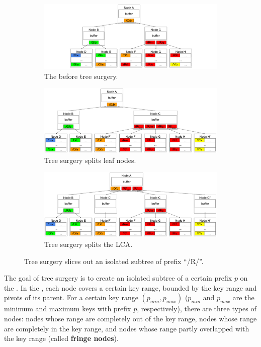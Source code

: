 \begin{figure}
    \begin{subfigure}{\textwidth}
        \centering
        \includegraphics[width=.9\linewidth]{fig/slice-1}
        \caption{\label{subfig:slice-1} The \bet before tree surgery.}
    \end{subfigure}
    \begin{subfigure}{\textwidth}
        \centering
        \includegraphics[width=.9\linewidth]{fig/slice-2}
        \caption{\label{subfig:slice-2} Tree surgery splits leaf nodes.}
    \end{subfigure}
    \begin{subfigure}{\textwidth}
        \centering
        \includegraphics[width=.9\linewidth]{fig/slice-3}
        \caption{\label{subfig:slice-3} Tree surgery splits the LCA.}
    \end{subfigure}
    \caption[Tree surgery example]{\label{fig:slice}
        Tree surgery slices out an isolated subtree of prefix ``/R/''.}
\end{figure}

The goal of tree surgery is to create an isolated subtree of a certain
prefix $p$ on the \bet.
In the \bet, each node covers a certain key range, bounded by the key range and
pivots of its parent.
For a certain key range $(p_{min}, p_{max})$ ($p_{min}$ and $p_{max}$ are the
minimum and maximum keys with prefix $p$, respectively), there are three types
of nodes: nodes whose range are completely out of the key range, nodes whose
range are completely in the key range, and nodes whose range partly overlapped
with the key range (called \textbf{fringe nodes}).

